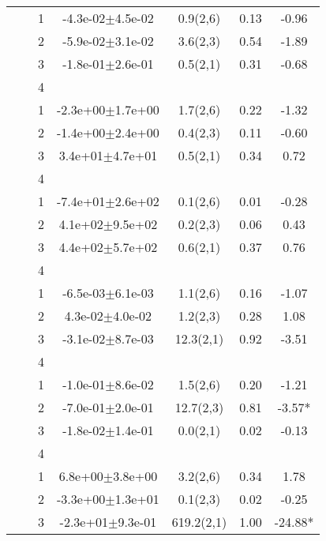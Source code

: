 \begin{longtable}{llccccS[table-format=-2.2, table-space-text-post = {***}]}
   \midrule
{} & {} & 1 & -4.3e-02$\pm$4.5e-02 & 0.9(2,6) & 0.13 & -0.96 \\ 
   &  & 2 & -5.9e-02$\pm$3.1e-02 & 3.6(2,3) & 0.54 & -1.89 \\ 
   &  & 3 & -1.8e-01$\pm$2.6e-01 & 0.5(2,1) & 0.31 & -0.68 \\ 
   &  & 4 &  &  &  &  \\ 
   \midrule
{} & {} & 1 & -2.3e+00$\pm$1.7e+00 & 1.7(2,6) & 0.22 & -1.32 \\ 
   &  & 2 & -1.4e+00$\pm$2.4e+00 & 0.4(2,3) & 0.11 & -0.60 \\ 
   &  & 3 &  3.4e+01$\pm$4.7e+01 & 0.5(2,1) & 0.34 & 0.72 \\ 
   &  & 4 &  &  &  &  \\ 
   \midrule
{} & {} & 1 & -7.4e+01$\pm$2.6e+02 & 0.1(2,6) & 0.01 & -0.28 \\ 
   &  & 2 &  4.1e+02$\pm$9.5e+02 & 0.2(2,3) & 0.06 & 0.43 \\ 
   &  & 3 &  4.4e+02$\pm$5.7e+02 & 0.6(2,1) & 0.37 & 0.76 \\ 
   &  & 4 &  &  &  &  \\ 
   \midrule
{} & {} & 1 & -6.5e-03$\pm$6.1e-03 & 1.1(2,6) & 0.16 & -1.07 \\ 
   &  & 2 &  4.3e-02$\pm$4.0e-02 & 1.2(2,3) & 0.28 & 1.08 \\ 
   &  & 3 & -3.1e-02$\pm$8.7e-03 & 12.3(2,1) & 0.92 & -3.51 \\ 
   &  & 4 &  &  &  &  \\ 
   \midrule
{} & {} & 1 & -1.0e-01$\pm$8.6e-02 & 1.5(2,6) & 0.20 & -1.21 \\ 
   &  & 2 & -7.0e-01$\pm$2.0e-01 & 12.7(2,3) & 0.81 & -3.57* \\ 
   &  & 3 & -1.8e-02$\pm$1.4e-01 & 0.0(2,1) & 0.02 & -0.13 \\ 
   &  & 4 &  &  &  &  \\ 
   \midrule
{} & {} & 1 &  6.8e+00$\pm$3.8e+00 & 3.2(2,6) & 0.34 & 1.78 \\ 
   &  & 2 & -3.3e+00$\pm$1.3e+01 & 0.1(2,3) & 0.02 & -0.25 \\ 
   &  & 3 & -2.3e+01$\pm$9.3e-01 & 619.2(2,1) & 1.00 & -24.88* \\ 

\end{longtable}
